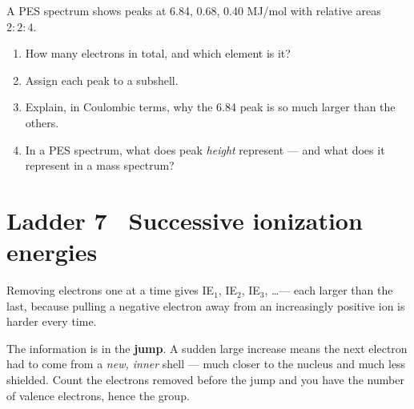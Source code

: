 \documentclass{apchem-worksheet}
\begin{document}
\begin{yourturn}
A PES spectrum shows peaks at 6.84, 0.68, 0.40 MJ/mol with relative
areas $2 : 2 : 4$.
\begin{enumerate}[leftmargin=*,itemsep=0.5em]
  \item How many electrons in total, and which element is it?
        \workspace[1.4cm]
  \item Assign each peak to a subshell. \workspace[1.6cm]
  \item Explain, in Coulombic terms, why the 6.84 peak is so much larger
        than the others. \workspace[1.8cm]
  \item In a PES spectrum, what does peak \emph{height} represent --- and
        what does it represent in a mass spectrum? \workspace[1.6cm]
\end{enumerate}
\end{yourturn}

\section*{\sffamily Ladder 7 \textbullet\ Successive ionization energies}

Removing electrons one at a time gives IE$_1$, IE$_2$, IE$_3$, \ldots ---
each larger than the last, because pulling a negative electron away from
an increasingly positive ion is harder every time.

The information is in the \textbf{jump}. A sudden large increase means
the next electron had to come from a \emph{new, inner} shell --- much
closer to the nucleus and much less shielded. Count the electrons removed
before the jump and you have the number of valence electrons, hence the
group.
\end{document}
